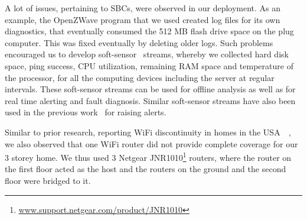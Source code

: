 \documentclass[10pt]{sensys-proc}
\newcommand{\secref}[1]{Section~\ref{#1}}
\begin{document}


A lot of issues, pertaining to SBCs, were observed in our deployment. As an example, the OpenZWave program that we used created log files for its own diagnostics, that eventually consumed the 512 MB flash drive space on the plug computer. This was fixed eventually by deleting older logs. Such problems encouraged us to develop soft-sensor~\cite{softgreen} streams, whereby we collected hard disk space, ping success, CPU utilization, remaining RAM space and temperature of the processor, for all the computing devices including the server at regular intervals. These soft-sensor streams can be used for offline analysis as well as for real time alerting and fault diagnosis. Similar soft-sensor streams have also been used in the previous work~\cite{hitchhiker_residential} for raising alerts.

Similar to prior research, reporting WiFi discontinuity in homes in the USA~~\cite{hitchhiker_residential}, we also observed that one WiFi router did not provide complete coverage for our 3 storey home. We thus used 3 Netgear JNR1010\footnote{\url{www.support.netgear.com/product/JNR1010}} routers, where the router on the first floor acted as the host and the routers on the ground and the second floor were bridged to it. %

\vspace{-1mm}
\end{document}
